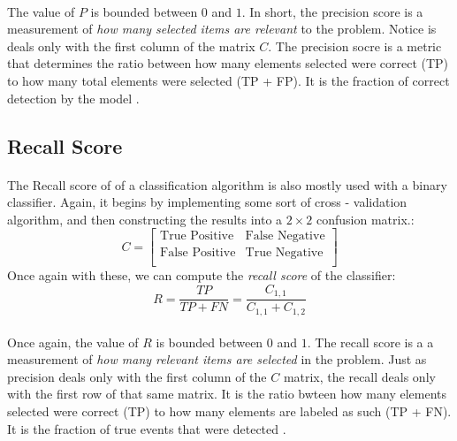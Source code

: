 \documentclass[12pt,letterpaper]{article}
\begin{document}
\paragraph*{}The value of $P$ is bounded between $0$ and $1$. In short, the precision score is a measurement of \textit{how many selected items are relevant} to the problem. Notice is deals only with the first column of the matrix $C$. The precision socre is a metric that determines the ratio between how many elements selected were correct (TP) to how many total elements were selected (TP + FP). It is the fraction of correct detection by the model \cite{Goodfellow}. 


\subsection{Recall Score}
\paragraph*{}The Recall score of of a classification algorithm is also mostly used with a binary classifier. Again, it begins by implementing some sort of cross - validation algorithm, and then constructing the results into a $2 \times 2$ confusion matrix.:
\begin{equation}
C = 
\begin{bmatrix}
\text{True Positive} & \text{False Negative} \\
\text{False Positive} & \text{True Negative} \\
\end{bmatrix}
\end{equation}
Once again with these, we can compute the \textit{recall score} of the classifier:
\begin{equation}
\label{recall score}
R = \frac{TP}{TP + FN} = \frac{C_{1,1}}{C_{1,1}+C_{1,2}}
\end{equation}
\paragraph*{}Once again, the value of $R$ is bounded between $0$ and $1$. The recall score is a a measurement of \textit{how many relevant items are selected} in the problem. Just as precision deals only with the first column of the $C$ matrix, the recall deals only with the first row of that same matrix. It is the ratio bwteen how many elements selected were correct (TP) to how many elements are labeled as such (TP + FN). It is the fraction of true events that were detected \cite{Goodfellow}.
\end{document}
